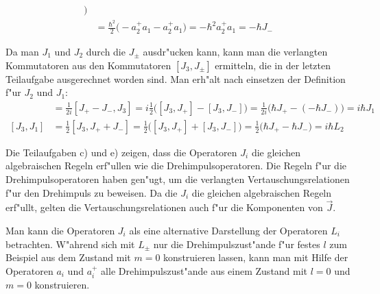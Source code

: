 \begin{loesung}
\begin{teilaufgaben}
\begin{align*}
\bigr)
\\
&=\frac{\hbar^2}{2}
\bigl(
-a_2^+a_1 - a_2^+a_1
\bigr)
=-\hbar^2 a_2^+a_1=-\hbar J_-
\end{align*}
\item 
Da man $J_1$ und $J_2$ durch die $J_\pm$ ausdr"ucken kann, kann man
die verlangten Kommutatoren aus den
Kommutatoren $[J_3,J_\pm]$ ermitteln, die in der letzten Teilaufgabe
ausgerechnet worden sind.
Man erh"alt nach einsetzen der Definition f"ur $J_2$ und $J_1$:
\begin{align*}
[J_2,J_3]
&=
\frac1{2i}[J_+-J_-,J_3]
=
i\frac{1}{2}\bigl([J_3,J_+] - [J_3,J_-]\bigr)
=
\frac1{2i}\bigl(\hbar J_+-(-\hbar J_-)\bigr)
=i\hbar J_1
\\
[J_3,J_1]
&=
\frac{1}{2}[J_3,J_++J_-]
=
\frac{1}{2}\bigl(
[J_3,J_+]
+
[J_3,J_-]
\bigr)
=\frac12\bigl(
\hbar J_+
-
\hbar J_-
\bigr)
=i\hbar L_2
\end{align*}
\item Die Teilaufgaben c) und e) zeigen, dass die Operatoren $J_i$
die gleichen algebraischen Regeln erf"ullen wie die Drehimpulsoperatoren.
Die Regeln f"ur die Drehimpulsoperatoren haben gen"ugt, um die verlangten
Vertauschungsrelationen f"ur den Drehimpuls zu beweisen. Da die $J_i$
die gleichen algebraischen Regeln erf"ullt, gelten die Vertauschungsrelationen
auch f"ur die Komponenten von $\vec J$.
\end{teilaufgaben}
\end{loesung}

\begin{diskussion}
Man kann die Operatoren $J_i$ als eine alternative Darstellung der Operatoren
$L_i$ betrachten.
W"ahrend sich mit $L_\pm$ nur die Drehimpulszust"ande f"ur festes
$l$ zum Beispiel aus dem Zustand mit $m=0$ konstruieren lassen,
kann man mit Hilfe der Operatoren $a_i$ und $a_i^+$ alle Drehimpulszust"ande
aus einem Zustand mit $l=0$ und $m=0$ konstruieren.
\end{diskussion}

